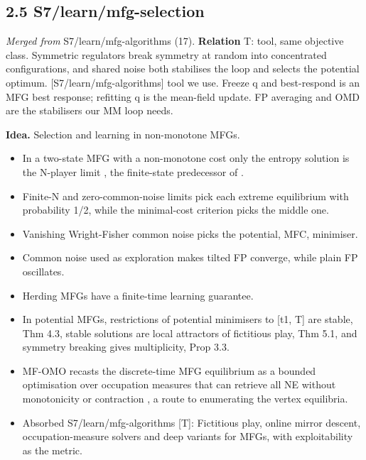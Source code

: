\documentclass[10pt]{article}
\begin{document}
\subsection{2.5 S7/learn/mfg-selection}\label{node:S7-S7-learn-mfg-selection}
\textit{Merged from} S7/learn/mfg-algorithms (17). \textbf{Relation} \textsf{T}: tool, same objective class. Symmetric regulators break symmetry at random into concentrated configurations, and shared noise both stabilises the loop and selects the potential optimum. [S7/learn/mfg-algorithms] tool we use. Freeze q and best-respond is an MFG best response; refitting q is the mean-field update. FP averaging and OMD are the stabilisers our MM loop needs.

\textbf{Idea.} Selection and learning in non-monotone MFGs.
\begin{itemize}[nosep,leftmargin=1.2em]
\item In a two-state MFG with a non-monotone cost only the entropy solution is the N-player limit \citep{Bayraktar-non19}, the finite-state predecessor of \citet{Cecchin-selection21}.
\item Finite-N and zero-common-noise limits pick each extreme equilibrium with probability 1/2, while the minimal-cost criterion picks the middle one.
\item Vanishing Wright-Fisher common noise picks the potential, MFC, minimiser.
\item Common noise used as exploration makes tilted FP converge, while plain FP oscillates.
\item Herding MFGs have a finite-time learning guarantee.
\item In potential MFGs, restrictions of potential minimisers to [t1, T] are stable, \citet{Briani-stable17} Thm 4.3, stable solutions are local attractors of fictitious play, Thm 5.1, and symmetry breaking gives multiplicity, Prop 3.3.
\item MF-OMO recasts the discrete-time MFG equilibrium as a bounded optimisation over occupation measures that can retrieve all NE without monotonicity or contraction \citep{Guo-mfomo22}, a route to enumerating the vertex equilibria.
\item Absorbed S7/learn/mfg-algorithms [T]: Fictitious play, online mirror descent, occupation-measure solvers and deep variants for MFGs, with exploitability as the metric.
\end{itemize}
\end{document}

